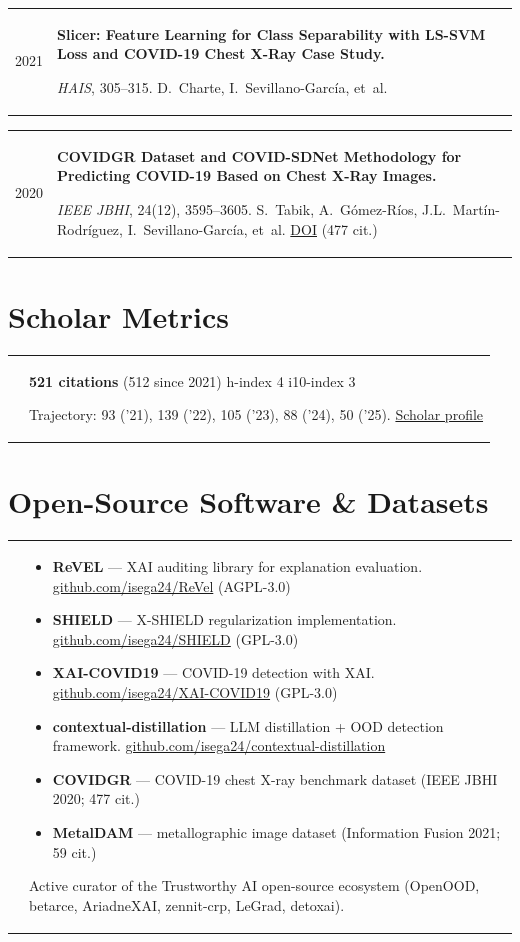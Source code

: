 \documentclass[11pt,a4paper]{article}
\makeatletter
\newcommand{\entry}[2]{%
  \noindent
  \begin{tabularx}{\textwidth}{@{}p{0.18\textwidth}@{\hspace{0.02\textwidth}}X@{}}
    #1 & #2
  \end{tabularx}
  \par\vspace{0.15em}
}
\newcommand{\subt}[1]{{\color{subtitle}\small #1}\par}
\makeatother
\begin{document}
\entry{2021}{%
  \textbf{Slicer: Feature Learning for Class Separability with LS-SVM Loss and COVID-19 Chest X-Ray Case Study.} \par
  \subt{\textit{HAIS}, 305--315. D.~Charte, I.~Sevillano-García, et~al.}
}

\entry{2020}{%
  \textbf{COVIDGR Dataset and COVID-SDNet Methodology for Predicting COVID-19 Based on Chest X-Ray Images.} \par
  \subt{\textit{IEEE JBHI}, 24(12), 3595--3605. S.~Tabik, A.~Gómez-Ríos, J.L.~Martín-Rodríguez, I.~Sevillano-García, et~al. \href{https://doi.org/10.1109/JBHI.2020.3037127}{DOI} \quad (477 cit.)}
}

\section*{Scholar Metrics}

\entry{}{%
  \textbf{521 citations} (512 since 2021) \quad\textbar\quad h-index 4 \quad\textbar\quad i10-index 3 \par
  \subt{Trajectory: 93 ('21), 139 ('22), 105 ('23), 88 ('24), 50 ('25). \quad \href{https://scholar.google.com/citations?user=g5xyauEAAAAJ}{Scholar profile}}
}

\section*{Open-Source Software \& Datasets}

\entry{}{%
  \begin{itemize}
    \item \textbf{ReVEL} --- XAI auditing library for explanation evaluation. \href{https://github.com/isega24/ReVel}{github.com/isega24/ReVel} (AGPL-3.0)
    \item \textbf{SHIELD} --- X-SHIELD regularization implementation. \href{https://github.com/isega24/SHIELD}{github.com/isega24/SHIELD} (GPL-3.0)
    \item \textbf{XAI-COVID19} --- COVID-19 detection with XAI. \href{https://github.com/isega24/XAI-COVID19}{github.com/isega24/XAI-COVID19} (GPL-3.0)
    \item \textbf{contextual-distillation} --- LLM distillation + OOD detection framework. \href{https://github.com/isega24/contextual-distillation}{github.com/isega24/contextual-distillation}
    \item \textbf{COVIDGR} --- COVID-19 chest X-ray benchmark dataset (IEEE JBHI 2020; 477 cit.)
    \item \textbf{MetalDAM} --- metallographic image dataset (Information Fusion 2021; 59 cit.)
  \end{itemize}
  \subt{Active curator of the Trustworthy AI open-source ecosystem (OpenOOD, betarce, AriadneXAI, zennit-crp, LeGrad, detoxai).}
}
\end{document}
